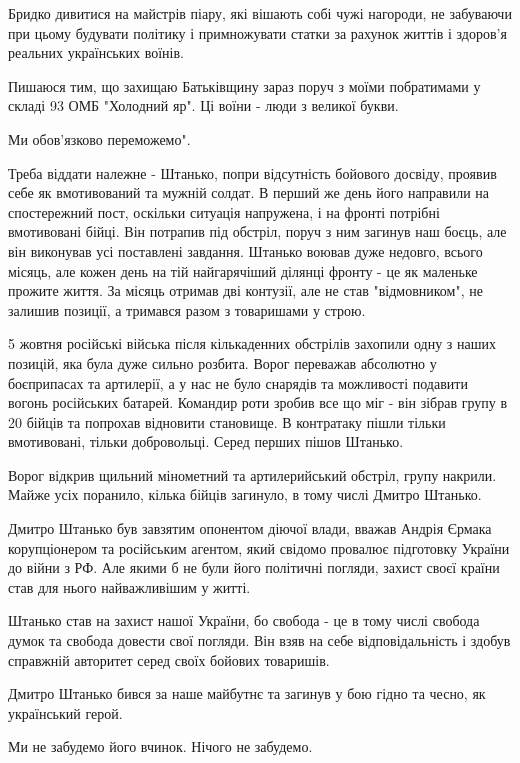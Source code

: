 Бридко дивитися на майстрів піару, які вішають собі чужі нагороди, не забуваючи
при цьому будувати політику і примножувати статки за рахунок життів і здоров'я
реальних українських воїнів.

Пишаюся тим, що захищаю Батьківщину зараз поруч з моїми побратимами у складі 93
ОМБ "Холодний яр". Ці воїни - люди з великої букви.

Ми обов'язково переможемо".

Треба віддати належне - Штанько, попри відсутність бойового досвіду, проявив
себе як вмотивований та мужній солдат. В перший же день його направили на
спостережний пост, оскільки ситуація напружена, і на фронті потрібні
вмотивовані бійці. Він потрапив під обстріл, поруч з ним загинув наш боєць, але
він виконував усі поставлені завдання. Штанько воював дуже недовго, всього
місяць, але кожен день на тій найгарячіший ділянці фронту - це як маленьке
прожите життя. За місяць отримав дві контузії, але не став "відмовником", не
залишив позиції, а тримався разом з товаришами у строю.

5 жовтня російські війська після кількаденних обстрілів захопили одну з наших
позицій, яка була дуже сильно розбита. Ворог переважав абсолютно у боєприпасах
та артилерії, а у нас не було снарядів та можливості подавити вогонь російських
батарей. Командир роти зробив все що міг - він зібрав групу в 20 бійців та
попрохав відновити становище. В контратаку пішли тільки вмотивовані, тільки
добровольці. Серед перших пішов Штанько.

Ворог відкрив щильний мінометний та артилерийський обстріл, групу накрили.
Майже усіх поранило, кілька бійців загинуло, в тому числі Дмитро Штанько.

Дмитро Штанько був завзятим опонентом діючої влади, вважав Андрія Єрмака
корупціонером та російським агентом, який свідомо провалює підготовку України
до війни з РФ. Але якими б не були його політичні погляди, захист своєї країни
став для нього найважливішим у житті.

Штанько став на захист нашої України, бо свобода - це в тому числі свобода
думок та свобода довести свої погляди. Він взяв на себе відповідальність і
здобув справжній авторитет серед своїх бойових товаришів.

Дмитро Штанько бився за наше майбутнє та загинув у бою гідно та чесно, як
український герой.

Ми не забудемо його вчинок. Нічого не забудемо.

